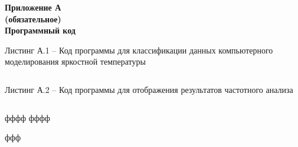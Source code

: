 \newpage
{} 
\begin{center} 
    \textbf{Приложение А}
    \\
    \textbf{(обязательное)}
    \\
    \textbf{Программный код}
\end{center} 
\vspace{8mm}
\par
Листинг А.1 -- Код программы для классификации данных компьютерного моделирования яркостной температуры
\vspace{8mm}
\large
\begin{verbatim}

\end{verbatim}
\vspace{8mm}
\Large
\par
Листинг А.2 -- Код программы для отображения результатов частотного анализа
\vspace{8mm}
\large
\begin{verbatim}

\end{verbatim}
\vspace{8mm}
\Large
\newpage
{}
фффф
\newpage
фффф
\newpage
{}
ффф